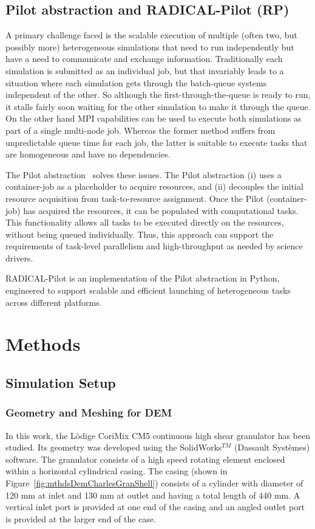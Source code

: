 \documentclass[preprint,11pt,authoryear]{elsarticle}
\begin{document}
\subsection{Pilot abstraction and RADICAL-Pilot (RP)}
A primary challenge faced is the scalable execution of multiple (often two,
but possibly more) heterogeneous simulations that need to run independently
but have a need to communicate and exchange information. Traditionally each
simulation is submitted as an individual job, but that invariably leads
to a situation where each simulation gets through the batch-queue systems
independent of the other. So although the first-through-the-queue is ready to
run, it stalls fairly soon waiting for the other simulation to make it through
the queue.  On the other hand MPI capabilities can be used to  execute both
simulations as part of a single multi-node job.  Whereas the former
method suffers from unpredictable queue time for each job, the latter is
suitable to execute tasks that are homogeneous and have no dependencies.


The Pilot abstraction~\citep{pstar12} solves these issues. The Pilot abstraction 
(i) uses a container-job as a placeholder to acquire resources, and (ii) decouples 
the initial resource acquisition from task-to-resource assignment. Once the 
Pilot (container-job) has acquired the resources, it can be populated with 
computational tasks. This functionality allows all tasks to be executed directly 
on the resources, without being queued individually. Thus, this approach can support 
the requirements of task-level parallelism and high-throughput as needed by 
science drivers.

RADICAL-Pilot is an implementation of the Pilot abstraction in Python, engineered to
support scalable and efficient launching of heterogeneous tasks across different platforms.

\section{Methods}
\subsection{Simulation Setup}
\subsubsection{Geometry and Meshing for DEM}
In this work, the L\"{o}dige CoriMix CM5 continuous high shear granulator has 
been studied. Its geometry was developed using the SolidWorks$^{TM}$ (Dassault Syst\`{e}mes) software. 
The granulator consists of a high speed rotating element enclosed within a 
horizontal cylindrical casing. The casing 
(shown in Figure~\ref{fig:mthdsDemCharlesGranShell}) consists of a cylinder with 
diameter of 120 mm at inlet and 130 mm at outlet and having a total length of 440 mm. 
A vertical inlet port is provided at one end of the casing and an angled outlet port 
is provided at the larger end of the case. 
\end{document}
